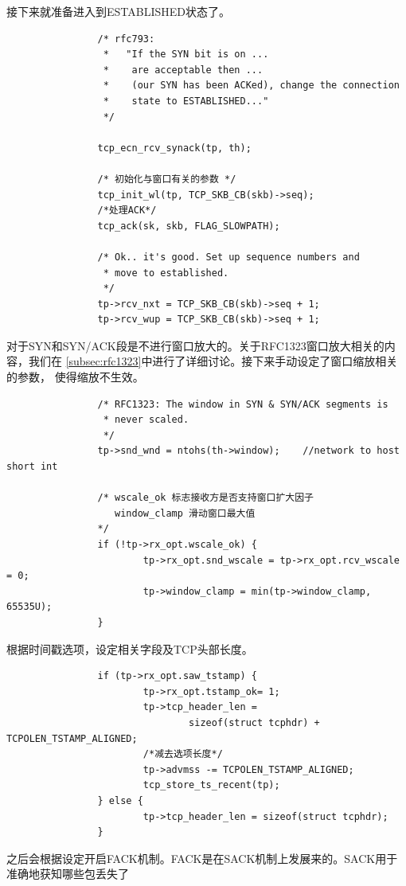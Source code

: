 接下来就准备进入到ESTABLISHED状态了。
\begin{verbatim}
                /* rfc793:
                 *   "If the SYN bit is on ...
                 *    are acceptable then ...
                 *    (our SYN has been ACKed), change the connection
                 *    state to ESTABLISHED..."
                 */

                tcp_ecn_rcv_synack(tp, th);

                /* 初始化与窗口有关的参数 */
                tcp_init_wl(tp, TCP_SKB_CB(skb)->seq);
                /*处理ACK*/
                tcp_ack(sk, skb, FLAG_SLOWPATH);

                /* Ok.. it's good. Set up sequence numbers and
                 * move to established.
                 */
                tp->rcv_nxt = TCP_SKB_CB(skb)->seq + 1;
                tp->rcv_wup = TCP_SKB_CB(skb)->seq + 1;
\end{verbatim}
对于SYN和SYN/ACK段是不进行窗口放大的。关于RFC1323窗口放大相关的内容，我们在
\ref{subsec:rfc1323}中进行了详细讨论。接下来手动设定了窗口缩放相关的参数，
使得缩放不生效。
\begin{verbatim}
                /* RFC1323: The window in SYN & SYN/ACK segments is
                 * never scaled.
                 */
                tp->snd_wnd = ntohs(th->window);    //network to host short int

                /* wscale_ok 标志接收方是否支持窗口扩大因子
                   window_clamp 滑动窗口最大值
                */                
                if (!tp->rx_opt.wscale_ok) {
                        tp->rx_opt.snd_wscale = tp->rx_opt.rcv_wscale = 0;
                        tp->window_clamp = min(tp->window_clamp, 65535U);
                }
\end{verbatim}
根据时间戳选项，设定相关字段及TCP头部长度。
\begin{verbatim}
                if (tp->rx_opt.saw_tstamp) {
                        tp->rx_opt.tstamp_ok= 1;
                        tp->tcp_header_len =
                                sizeof(struct tcphdr) + TCPOLEN_TSTAMP_ALIGNED;
                        /*减去选项长度*/                        
                        tp->advmss -= TCPOLEN_TSTAMP_ALIGNED;
                        tcp_store_ts_recent(tp);
                } else {
                        tp->tcp_header_len = sizeof(struct tcphdr);
                }
\end{verbatim}
之后会根据设定开启FACK机制。FACK是在SACK机制上发展来的。SACK用于准确地获知哪些包丢失了
